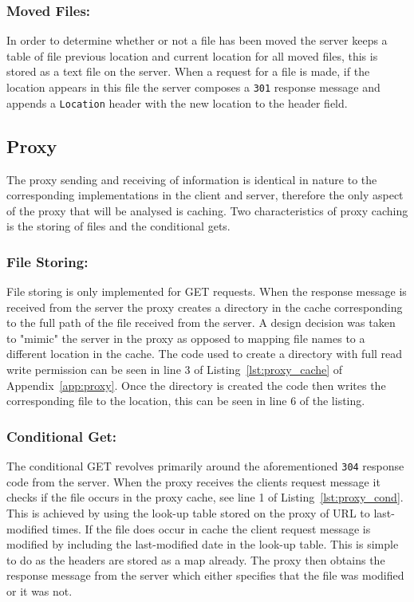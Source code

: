 \documentclass[10pt,twocolumn]{witseiepaper}
\begin{document}
		\subsubsection*{Moved Files:} In order to determine whether or not a file has been moved the server keeps a table of file previous location and current location for all moved files, this is stored as a text file on the server. When a request for a file is made, if the location appears in this file the server composes a \texttt{301} response message and appends a \texttt{Location} header with the new location to the header field.
		
	\subsection{Proxy}
		
		The proxy sending and receiving of information is identical in nature to the corresponding implementations in the client and server, therefore the only aspect of the proxy that will be analysed is caching. Two characteristics of proxy caching is the storing of files and the conditional gets. \\
		
		\subsubsection*{File Storing:} File storing is only implemented for GET requests. When the response message is received from the server the proxy creates a directory in the cache corresponding to the full path of the file received from the server. A design decision was taken to "mimic" the server in the proxy as opposed to mapping file names to a different location in the cache. The code used to create a directory with full read write permission can be seen in line 3 of Listing~\ref{lst:proxy_cache} of Appendix~\ref{app:proxy}. Once the directory is created the code then writes the corresponding file to the location, this can be seen in line 6 of the listing.
		
		\subsubsection*{Conditional Get:} The conditional GET revolves primarily around the aforementioned \texttt{304} response code from the server. When the proxy receives the clients request message it checks if the file occurs in the proxy cache, see line 1 of Listing~\ref{lst:proxy_cond}. This is achieved by using the look-up table stored on the proxy of URL to last-modified times. If the file does occur in cache the client request message is modified by including the last-modified date in the look-up table. This is simple to do as the headers are stored as a map already. The proxy then obtains the response message from the server which either specifies that the file was modified or it was not. \\
		
\end{document}
